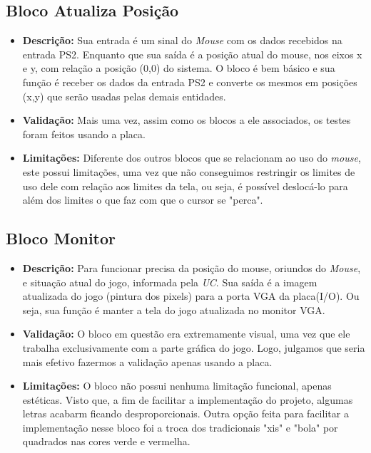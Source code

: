 \subsection{Bloco Atualiza Posição}
    \begin{itemize}
        \item \textbf{Descrição:} Sua entrada é um sinal do \emph{Mouse} com os dados recebidos na entrada PS2. Enquanto que sua saída é a posição atual do mouse, nos eixos x e y, com relação a posição (0,0) do sistema. O bloco é bem básico e sua função é receber os dados da entrada PS2 e converte os mesmos em posições (x,y) que serão usadas pelas demais entidades.
        \item \textbf{Validação:} Mais uma vez, assim como os blocos a ele associados, os testes foram feitos usando a placa.
        \item \textbf{Limitações:} Diferente dos outros blocos que se relacionam ao uso do \emph{mouse}, este possui limitações, uma vez que não conseguimos restringir os limites de uso dele com relação aos limites da tela, ou seja, é possível deslocá-lo para além dos limites o que faz com que o cursor se "perca".
    \end{itemize}

\subsection{Bloco Monitor}
    \begin{itemize}
        \item \textbf{Descrição:} Para funcionar precisa da posição do mouse, oriundos do \emph{Mouse}, e situação atual do jogo, informada pela \emph{UC}. Sua saída é a imagem atualizada do jogo (pintura dos pixels) para a porta VGA da placa(I/O). Ou seja, sua função é manter a tela do jogo atualizada no monitor VGA.
        \item \textbf{Validação:} O bloco em questão era extremamente visual, uma vez que ele trabalha exclusivamente com a parte gráfica do jogo. Logo, julgamos que seria mais efetivo fazermos a validação apenas usando a placa.
        \item \textbf{Limitações:} O bloco não possui nenhuma limitação funcional, apenas estéticas. Visto que, a fim de facilitar a implementação do projeto, algumas letras acabarm ficando desproporcionais. Outra opção feita para facilitar a implementação nesse bloco foi a troca dos tradicionais "xis" e "bola" por quadrados nas cores verde e vermelha.
    \end{itemize}

